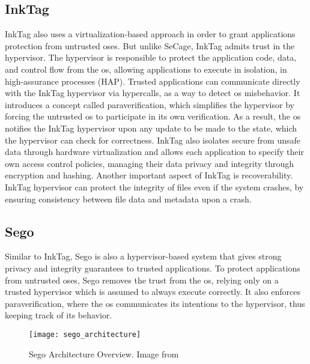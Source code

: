 
\subsection{InkTag} 

InkTag \cite{inkTagPaper} also uses a virtualization-based approach in order to grant applications protection from untrusted \gls{os}es.
But unlike SeCage, InkTag admits trust in the hypervisor. The hypervisor is responsible to protect the application
code, data, and control flow from the \gls{os}, allowing applications to execute in isolation, in high-assurance processes (HAP). Trusted applications can communicate directly with the InkTag hypervisor via hypercalls, as a way to detect \gls{os} misbehavior.
It introduces a concept called paraverification, which simplifies the hypervisor by forcing the untrusted \gls{os} to participate in its own verification. As a result, the \gls{os} notifies the InkTag hypervisor upon any update to be made to the state, which the hypervisor can check for correctness. 
InkTag also isolates secure from unsafe data through hardware virtualization and allows each application to specify their own access control policies, managing their data privacy and integrity through encryption and hashing.
Another important aspect of InkTag is recoverability. InkTag hypervisor can protect the integrity of files even if the system crashes, by ensuring consistency between file data and metadata upon a crash.\newline


\subsection{Sego} 

Similar to InkTag, Sego \cite{segoPaper} is also a hypervisor-based system that gives strong privacy and integrity guarantees to trusted applications. To protect applications from untrusted \gls{os}es, Sego removes the trust from the \gls{os}, relying only on a trusted hypervisor which is assumed to always execute correctly. It also enforces paraverification, where the \gls{os} communicates its intentions to the hypervisor, thus keeping track of its behavior.

\begin{figure}[htbp]
	\centering
	{\texttt{[image: sego\_architecture]}}
	\caption{Sego Architecture Overview. Image from \cite{segoPaper}}
	\label{fig:segoArchitecture}
\end{figure}

